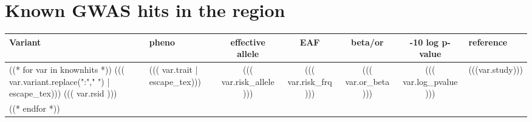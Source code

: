 \documentclass{article}
\begin{document}
\newpage

\section{ Known GWAS hits in the region}
\begin{longtable}{ >{\RaggedRight}p{3cm}|L{3cm}|c|c|c|c|>{\RaggedRight}p{3cm} }
Variant & pheno & effective allele & EAF & beta/or & -10 log p-value & reference \\
\hline
((* for var in knownhits *))
((( var.variant.replace(":"," ") | escape_tex))) \newline ((( var.rsid ))) & ((( var.trait | escape_tex))) & ((( var.risk_allele ))) & ((( var.risk_frq ))) & ((( var.or_beta ))) & ((( var.log_pvalue ))) & (((var.study))) \\
((* endfor *))
\end{longtable}
\endgroup
\end{document}
